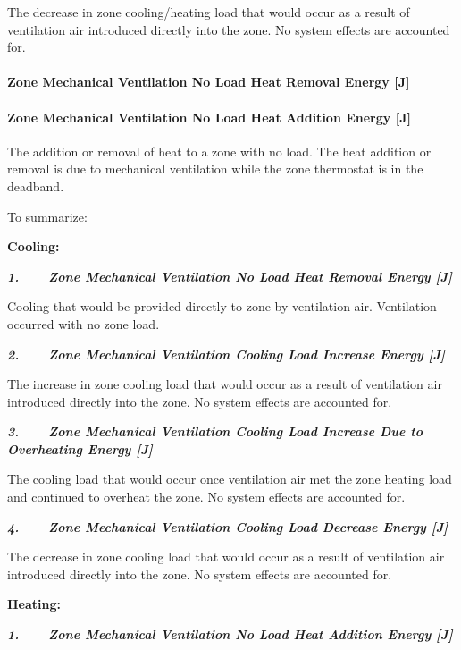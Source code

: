 The decrease in zone cooling/heating load that would occur as a result of ventilation air introduced directly into the zone. No system effects are accounted for.

\paragraph{Zone Mechanical Ventilation No Load Heat Removal Energy {[}J{]}}\label{zone-mechanical-ventilation-no-load-heat-removal-energy-j}

\paragraph{Zone Mechanical Ventilation No Load Heat Addition Energy {[}J{]}}\label{zone-mechanical-ventilation-no-load-heat-addition-energy-j}

The addition or removal of heat to a zone with no load. The heat addition or removal is due to mechanical ventilation while the zone thermostat is in the deadband.

To summarize:

\textbf{Cooling:}

\textbf{\emph{1.~~~~Zone Mechanical Ventilation No Load Heat Removal Energy {[}J{]}}}

Cooling that would be provided directly to zone by ventilation air. Ventilation occurred with no zone load.

\textbf{\emph{2.~~~~Zone Mechanical Ventilation Cooling Load Increase Energy {[}J{]}}}

The increase in zone cooling load that would occur as a result of ventilation air introduced directly into the zone. No system effects are accounted for.

\textbf{\emph{3.~~~~Zone Mechanical Ventilation Cooling Load Increase Due to Overheating Energy {[}J{]}}}

The cooling load that would occur once ventilation air met the zone heating load and continued to overheat the zone. No system effects are accounted for.

\textbf{\emph{4.~~~~Zone Mechanical Ventilation Cooling Load Decrease Energy {[}J{]}}}

The decrease in zone cooling load that would occur as a result of ventilation air introduced directly into the zone. No system effects are accounted for.

\textbf{Heating:}

\textbf{\emph{1.~~~~Zone Mechanical Ventilation No Load Heat Addition Energy {[}J{]}}}

